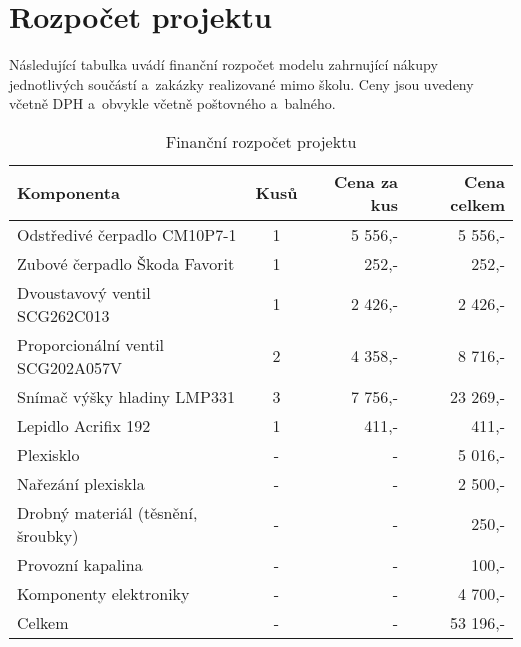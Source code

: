 ﻿\chapter{Rozpočet projektu}

Následující tabulka uvádí finanční rozpočet modelu zahrnující nákupy jednotlivých sou\-čás\-tí a~zakázky realizované mimo školu. Ceny jsou uvedeny včetně DPH a~obvykle včetně poštovného a~balného.

\begin{table}[H]
  \centering
  \caption{Finanční rozpočet projektu}\label{tab:financni-rozpocet}
    \begin{tabular}{|l|c|r|r|}
        \hline
        \textbf{Komponenta}                                         & \textbf{Kusů}       & \textbf{Cena za kus}     & \textbf{Cena celkem}\\ \hline \hline
        {Odstředivé čerpadlo CM10P7-1}                              & {1}                 & {5 556,-}                & {5 556,- }\\ \hline
        {Zubové čerpadlo Škoda Favorit}                             & {1}                 & {252,-}                  & {252,- }\\ \hline
        {Dvoustavový ventil SCG262C013}                             & {1}                 & {2 426,-}                & {2 426,- }\\ \hline
        {Proporcionální ventil SCG202A057V}                         & {2}                 & {4 358,-}                & {8 716,- }\\ \hline
        {Snímač výšky hladiny LMP331}                               & {3}                 & {7 756,-}                & {23 269,- }\\ \hline
        {Lepidlo Acrifix 192}                                       & {1}                 & {411,-}                  & {411,- }\\ \hline
        {Plexisklo}                                                 & {-}                 & {-}                      & {5 016,- }\\ \hline
        {Nařezání plexiskla}                                        & {-}                 & {-}                      & {2 500,- }\\ \hline
        {Drobný materiál (těsnění, šroubky)}                        & {-}                 & {-}                      & {250,- }\\ \hline
        {Provozní kapalina}                                         & {-}                 & {-}                      & {100,- }\\ \hline
        {Komponenty elektroniky}                                    & {-}                 & {-}                      & {4 700,- }\\ \hline \hline
        {Celkem}                                                    & {-}                 & {-}                      & {53 196,- }\\ \hline
    \end{tabular}
\end{table}

